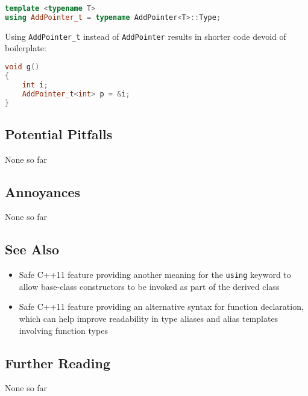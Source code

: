 \begin{lstlisting}[language=C++]
template <typename T>
using AddPointer_t = typename AddPointer<T>::Type;
\end{lstlisting}

\noindent Using \lstinline!AddPointer_t! instead of \lstinline!AddPointer! results in
shorter code devoid of boilerplate:

\begin{lstlisting}[language=C++]
void g()
{
    int i;
    AddPointer_t<int> p = &i;
}
\end{lstlisting}


\subsection[Potential Pitfalls]{Potential Pitfalls}\label{potential-pitfalls}

None so far

\subsection[Annoyances]{Annoyances}\label{annoyances}

None so far

\subsection[See Also]{See Also}\label{see-also}

\begin{itemize}
\item{Safe C++11 feature providing another meaning for the \lstinline!using! keyword to allow base-class constructors to be invoked as part of the derived class}
\item{Safe C++11 feature providing an alternative syntax for function declaration, which can help improve readability in type aliases and alias templates involving function types}
\end{itemize}

\subsection[Further Reading]{Further Reading}\label{further-reading}

None so far



